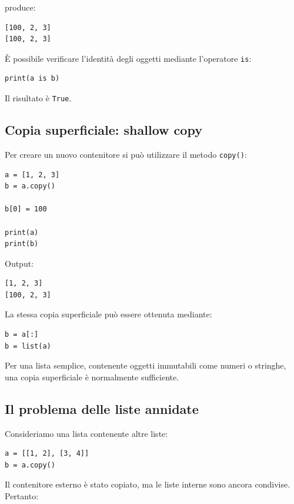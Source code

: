 \documentclass[11pt,a4paper]{book}
\begin{document}
produce:

\begin{lstlisting}[style=python, numbers=none]
[100, 2, 3]
[100, 2, 3]
\end{lstlisting}

È possibile verificare l'identità degli oggetti mediante l'operatore \texttt{is}:

\begin{lstlisting}[style=python]
print(a is b)
\end{lstlisting}

Il risultato è \texttt{True}.

\subsection{Copia superficiale: shallow copy}

Per creare un nuovo contenitore si può utilizzare il metodo \texttt{copy()}:

\begin{lstlisting}[style=python]
a = [1, 2, 3]
b = a.copy()

b[0] = 100

print(a)
print(b)
\end{lstlisting}

Output:

\begin{lstlisting}[style=python, numbers=none]
[1, 2, 3]
[100, 2, 3]
\end{lstlisting}

La stessa copia superficiale può essere ottenuta mediante:

\begin{lstlisting}[style=python]
b = a[:]
b = list(a)
\end{lstlisting}

Per una lista semplice, contenente oggetti immutabili come numeri o stringhe, una copia superficiale è normalmente sufficiente.

\subsection{Il problema delle liste annidate}

Consideriamo una lista contenente altre liste:

\begin{lstlisting}[style=python]
a = [[1, 2], [3, 4]]
b = a.copy()
\end{lstlisting}

Il contenitore esterno è stato copiato, ma le liste interne sono ancora condivise. Pertanto:
\end{document}
